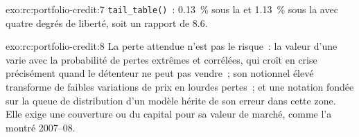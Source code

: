 \begin{solution}{exo:rc:portfolio-credit:7}
\texttt{tail\_table()}~: 0.13~\% sous la  et 1.13~\% sous la  avec
quatre degrés de liberté, soit un rapport de 8.6.
\end{solution}

\begin{solution}{exo:rc:portfolio-credit:8}
La perte attendue n'est pas le risque~: la valeur d'une  varie avec la
probabilité de pertes extrêmes et corrélées, qui croît en crise précisément quand le détenteur
ne peut pas vendre~; son notionnel élevé transforme de faibles variations de prix en lourdes pertes~; et une notation
fondée sur la queue de distribution d'un modèle hérite de son erreur dans cette zone. Elle exige une couverture ou du capital pour
sa valeur de marché, comme l'a montré 2007--08.
\end{solution}

